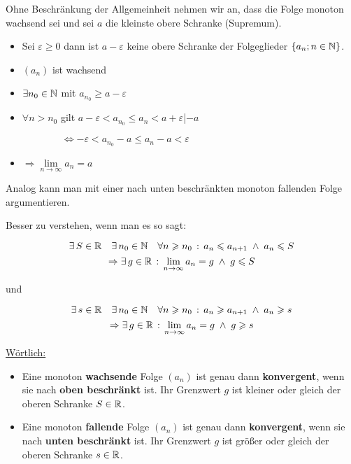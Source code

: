 \documentclass[main.tex]{subfiles}
\begin{document}
\begin{Beweis}
	Ohne Beschränkung der Allgemeinheit nehmen wir an, dass die Folge monoton wachsend sei und sei $a$ die kleinste obere Schranke (Supremum).
	\begin{itemize}
		\item Sei $\varepsilon\geq0$ dann ist $a-\varepsilon$ keine obere Schranke der Folgeglieder $\{a_n;n\in\mathbb{N}\}$.
		\item $(a_n)$ ist wachsend
		\item $\exists n_0\in\mathbb{N}$ mit $a_{n_{0}} \geq a-\varepsilon$
		\item $\forall n>n_0$ gilt $a-\varepsilon<a_{n_{0}}\leq a_n<a+\varepsilon$\qquad|$-a$
		
			$\qquad\qquad\Leftrightarrow -\varepsilon < a_{n_{0}}-a\leq a_n-a<\varepsilon$
		\item $\Rightarrow \lim\limits_{n\to\infty}a_n=a$
	\end{itemize}
	Analog kann man mit einer nach unten beschränkten monoton fallenden Folge argumentieren.
\end{Beweis}

Besser zu verstehen, wenn man es so sagt:

\begin{Theorem}
	$$\exists\, S\in\mathbb{R} \quad \exists \,n_0\in\mathbb{N} \quad \forall n\geqslant n_0\,:\, a_n\leqslant a_{n+1}\; \land \; a_n\leqslant S$$
	$$\Rightarrow \exists\, g\in\mathbb{R} \,:\, \lim\limits_{n\to\infty}a_n=g\;\land\; g\leqslant S $$
	\begin{center}und\end{center}
	$$\exists \, s\in\mathbb{R} \quad\exists \, n_0\in\mathbb{N} \quad \forall n\geqslant n_0\,:\, a_n\geqslant a_{n+1}\; \land \;a_n\geqslant s$$
	$$\Rightarrow \exists \, g\in\mathbb{R} \,:\, \lim\limits_{n\to\infty}a_n=g\;\land\; g\geqslant s$$
\end{Theorem}

	\underline{Wörtlich:}
\begin{itemize}
\item Eine monoton \textbf{wachsende} Folge $(a_n)$ ist genau dann \textbf{konvergent}, wenn sie nach \textbf{oben beschränkt} ist. Ihr Grenzwert $g$ ist kleiner oder gleich der oberen Schranke $S\in\mathbb{R}$.
\item  Eine monoton \textbf{fallende} Folge $(a_n)$ ist genau dann \textbf{konvergent}, wenn sie nach \textbf{unten beschränkt} ist. Ihr Grenzwert $g$ ist größer oder gleich der oberen Schranke $s\in\mathbb{R}$.
\end{itemize}
\end{document}

